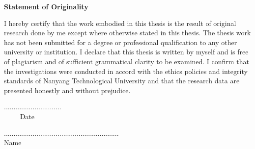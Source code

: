 \newpage

\begin{center}
	{\large \bfseries Statement of Originality}
\end{center}

\vspace{3em}

I hereby certify that the work embodied in this thesis is the result of original research done by me except where otherwise stated in this thesis. The thesis work has not been submitted for a degree or professional qualification to any other university or institution. I declare that this thesis is written by myself and is free of plagiarism and of sufficient grammatical clarity to be examined. I confirm that the investigations were conducted in accord with the ethics policies and integrity standards of Nanyang Technological University and that the research data are presented honestly and without prejudice.

\vspace{25em}

\begin{minipage}{0.45\textwidth}
	\begin{flushleft}
		.............................. \\
		$\quad\quad$ Date
	\end{flushleft}
\end{minipage}
\begin{minipage}{0.45\textwidth}
	\begin{flushright}
		............................................................ \\
		\centering Name
	\end{flushright}
\end{minipage}